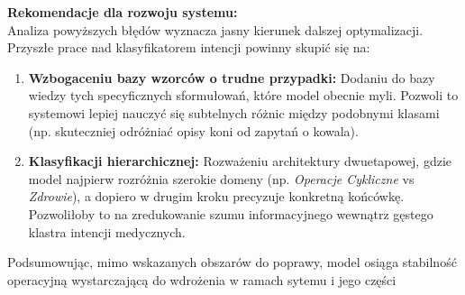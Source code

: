 \textbf{Rekomendacje dla rozwoju systemu:} \\
Analiza powyższych błędów wyznacza jasny kierunek dalszej optymalizacji. Przyszłe prace nad klasyfikatorem intencji powinny skupić się na:
\begin{enumerate}
    \item \textbf{Wzbogaceniu bazy wzorców o trudne przypadki:} Dodaniu do bazy wiedzy tych specyficznych sformułowań, które model obecnie myli. Pozwoli to systemowi lepiej nauczyć się subtelnych różnic między podobnymi klasami (np. skuteczniej odróżniać opisy koni od zapytań o kowala).
    \item \textbf{Klasyfikacji hierarchicznej:} Rozważeniu architektury dwuetapowej, gdzie model najpierw rozróżnia szerokie domeny (np. \textit{Operacje Cykliczne} vs \textit{Zdrowie}), a dopiero w drugim kroku precyzuje konkretną końcówkę. Pozwoliłoby to na zredukowanie szumu informacyjnego wewnątrz gęstego klastra intencji medycznych.
\end{enumerate}

Podsumowując, mimo wskazanych obszarów do poprawy, model osiąga stabilność operacyjną wystarczającą do wdrożenia w ramach sytemu  i jego części  
